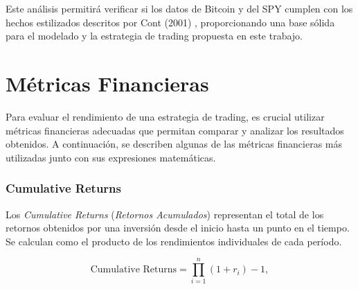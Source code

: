 \documentclass[a4paper,12pt, twoside]{report}
\begin{document}
    
    
    

Este análisis permitirá verificar si los datos de Bitcoin y del SPY cumplen con los hechos estilizados 
descritos por Cont (2001) \cite{Cont2001}, proporcionando una base sólida para el modelado y la estrategia 
de trading propuesta en este trabajo.


\section{Métricas Financieras}

Para evaluar el rendimiento de una estrategia de trading, es crucial utilizar métricas financieras adecuadas que permitan comparar y analizar los resultados obtenidos. A continuación, se describen algunas de las métricas financieras más utilizadas junto con sus expresiones matemáticas.

\subsubsection{Cumulative Returns}

Los \textit{Cumulative Returns} (\textit{Retornos Acumulados}) representan el total de los retornos obtenidos por una inversión desde el inicio hasta un punto en el tiempo. Se calculan como el producto de los rendimientos individuales de cada período.

\begin{equation}
\text{Cumulative Returns} = \prod_{i=1}^{n} (1 + r_i) - 1,
\end{equation}
\end{document}
